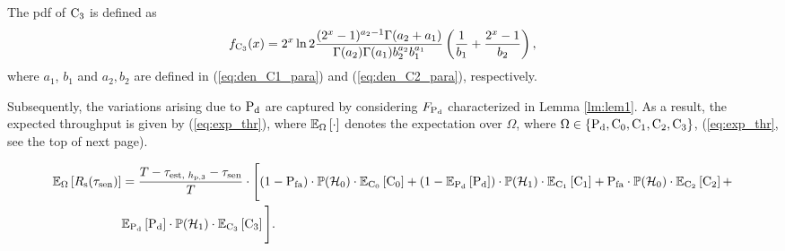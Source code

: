 \begin{lemma} \label{lm:lem6}
\normalfont
The pdf of $\text{C}_3$ is defined as 
\begin{align}
\hspace{-2mm}
\dcth(x) &= 2^x \ln 2 \frac{(2^x - 1)^{a_2 - 1} \Gamma(a_2 + a_1)}{\Gamma(a_2) \Gamma(a_1) b_2^{a_2} b_1^{a_1}} \left(\frac{1}{b_1} + \frac{2^x - 1}{b_2}\right), \label{eq:den_C3}
\end{align}
where $a_1$, $b_1$ and $a_2, b_2$ are defined in (\ref{eq:den_C1_para}) and (\ref{eq:den_C2_para}), respectively.
\end{lemma}
Subsequently, the variations arising due to $\text{P}_{\text{d}}$ are captured by considering $F_{\text{P}_{\text{d}}}$ characterized in Lemma \ref{lm:lem1}. As a result, the expected throughput is given by (\ref{eq:exp_thr}), where ${\mathbb E}_{\Omega}\left[ \cdot \right]$ denotes the expectation over $\Omega$, where $\Omega \in \{ \text{P}_{\text{d}}, \text{C}_0, \text{C}_1, \text{C}_2, \text{C}_3 \}$, (\ref{eq:exp_thr}, see the top of next page).
\begin{figure}
\begin{align}
\e{\Omega}{\rs(\tsen)} &= \frac{T - \testpr - \tsen}{T} \cdot \Bigg[ (1 - \pfa) \cdot \phz \cdot \e{\cz}{\cz} +  (1 - \e{\pd}\pd) \cdot \pho \cdot \e{\co}{\co}  + \pfa \cdot \phz \cdot \e{\ctw}{\ctw} +  \nonumber \\ & \e{\pd}{\pd} \cdot \pho \cdot \e{\cth}{\cth} \Bigg]. \label{eq:exp_thr} 
\end{align}
\hrulefill
\vspace*{-0.4cm}
\end{figure}


